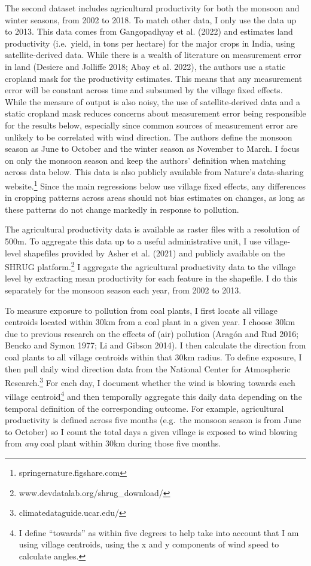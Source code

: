 \documentclass[
]{article}
\begin{document}
The second dataset includes agricultural productivity for both the monsoon and winter seasons, from 2002 to 2018. To match other data, I only use the data up to 2013. This data comes from Gangopadhyay et al. (2022) and estimates land productivity (i.e.~yield, in tons per hectare) for the major crops in India, using satellite-derived data. While there is a wealth of literature on measurement error in land (Desiere and Jolliffe 2018; Abay et al. 2022), the authors use a static cropland mask for the productivity estimates. This means that any measurement error will be constant across time and subsumed by the village fixed effects. While the measure of output is also noisy, the use of satellite-derived data and a static cropland mask reduces concerns about measurement error being responsible for the results below, especially since common sources of measurement error are unlikely to be correlated with wind direction. The authors define the monsoon season as June to October and the winter season as November to March. I focus on only the monsoon season and keep the authors' definition when matching across data below. This data is also publicly available from Nature's data-sharing website.\footnote{springernature.figshare.com} Since the main regressions below use village fixed effects, any differences in cropping patterns across areas should not bias estimates on changes, as long as these patterns do not change markedly in response to pollution.

The agricultural productivity data is available as raster files with a resolution of 500m. To aggregate this data up to a useful administrative unit, I use village-level shapefiles provided by Asher et al. (2021) and publicly available on the SHRUG platform.\footnote{www.devdatalab.org/shrug\_download/} I aggregate the agricultural productivity data to the village level by extracting mean productivity for each feature in the shapefile. I do this separately for the monsoon season each year, from 2002 to 2013.

To measure exposure to pollution from coal plants, I first locate all village centroids located within 30km from a coal plant in a given year. I choose 30km due to previous research on the effects of (air) pollution (Aragón and Rud 2016; Bencko and Symon 1977; Li and Gibson 2014). I then calculate the direction from coal plants to all village centroids within that 30km radius. To define exposure, I then pull daily wind direction data from the National Center for Atmospheric Research.\footnote{climatedataguide.ucar.edu/} For each day, I document whether the wind is blowing towards each village centroid\footnote{I define ``towards'' as within five degrees to help take into account that I am using village centroids, using the x and y components of wind speed to calculate angles.} and then temporally aggregate this daily data depending on the temporal definition of the corresponding outcome. For example, agricultural productivity is defined across five months (e.g.~the monsoon season is from June to October) so I count the total days a given village is exposed to wind blowing from \emph{any} coal plant within 30km during those five months.
\end{document}
